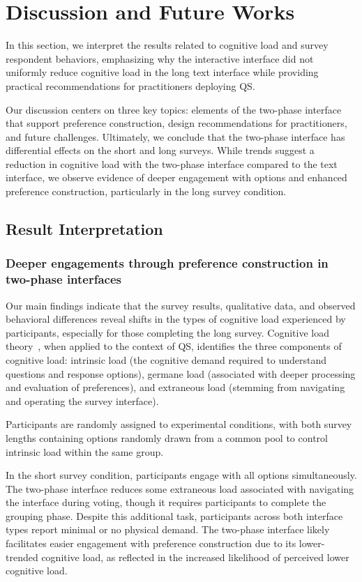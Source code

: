 \section{Discussion and Future Works}
\label{sec:discussion}

In this section, we interpret the results related to cognitive load and survey respondent behaviors, emphasizing why the interactive interface did not uniformly reduce cognitive load in the long text interface while providing practical recommendations for practitioners deploying QS.

Our discussion centers on three key topics: elements of the two-phase interface that support preference construction, design recommendations for practitioners, and future challenges. Ultimately, we conclude that the two-phase interface has differential effects on the short and long surveys. While trends suggest a reduction in cognitive load with the two-phase interface compared to the text interface, we observe evidence of deeper engagement with options and enhanced preference construction, particularly in the long survey condition.

\subsection{Result Interpretation}
\subsubsection{Deeper engagements through preference construction in two-phase interfaces}

Our main findings indicate that the survey results, qualitative data, and observed behavioral differences reveal shifts in the types of cognitive load experienced by participants, especially for those completing the long survey. Cognitive load theory~\cite{swellerCognitiveLoadTheory2011}, when applied to the context of QS, identifies the three components of cognitive load: intrinsic load (the cognitive demand required to understand questions and response options), germane load (associated with deeper processing and evaluation of preferences), and extraneous load (stemming from navigating and operating the survey interface).

Participants are randomly assigned to experimental conditions, with both survey lengths containing options randomly drawn from a common pool to control intrinsic load within the same group.  

In the short survey condition, participants engage with all options simultaneously. The two-phase interface reduces some extraneous load associated with navigating the interface during voting, though it requires participants to complete the grouping phase. Despite this additional task, participants across both interface types report minimal or no physical demand. The two-phase interface likely facilitates easier engagement with preference construction due to its lower-trended cognitive load, as reflected in the increased likelihood of perceived lower cognitive load.  

